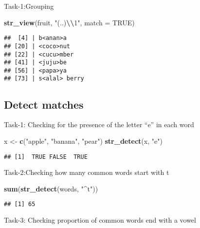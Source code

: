 \documentclass[
]{article}
\newenvironment{Shaded}{\begin{snugshade}}{\end{snugshade}}
\newcommand{\AttributeTok}[1]{\textcolor[rgb]{0.13,0.29,0.53}{#1}}
\newcommand{\ConstantTok}[1]{\textcolor[rgb]{0.56,0.35,0.01}{#1}}
\newcommand{\FunctionTok}[1]{\textcolor[rgb]{0.13,0.29,0.53}{\textbf{#1}}}
\newcommand{\NormalTok}[1]{#1}
\newcommand{\OtherTok}[1]{\textcolor[rgb]{0.56,0.35,0.01}{#1}}
\newcommand{\SpecialCharTok}[1]{\textcolor[rgb]{0.81,0.36,0.00}{\textbf{#1}}}
\newcommand{\StringTok}[1]{\textcolor[rgb]{0.31,0.60,0.02}{#1}}
\begin{document}
Task-1:Grouping

\begin{Shaded}
\begin{Highlighting}[]
\FunctionTok{str\_view}\NormalTok{(fruit, }\StringTok{"(..)}\SpecialCharTok{\textbackslash{}\textbackslash{}}\StringTok{1"}\NormalTok{, }\AttributeTok{match =} \ConstantTok{TRUE}\NormalTok{)}
\end{Highlighting}
\end{Shaded}

\begin{verbatim}
##  [4] | b<anan>a
## [20] | <coco>nut
## [22] | <cucu>mber
## [41] | <juju>be
## [56] | <papa>ya
## [73] | s<alal> berry
\end{verbatim}

\hypertarget{detect-matches}{%
\subsection{Detect matches}\label{detect-matches}}

Task-1: Checking for the presence of the letter ``e'' in each word

\begin{Shaded}
\begin{Highlighting}[]
\NormalTok{x }\OtherTok{\textless{}{-}} \FunctionTok{c}\NormalTok{(}\StringTok{"apple"}\NormalTok{, }\StringTok{"banana"}\NormalTok{, }\StringTok{"pear"}\NormalTok{)}
\FunctionTok{str\_detect}\NormalTok{(x, }\StringTok{"e"}\NormalTok{)}
\end{Highlighting}
\end{Shaded}

\begin{verbatim}
## [1]  TRUE FALSE  TRUE
\end{verbatim}

Task-2:Checking how many common words start with t

\begin{Shaded}
\begin{Highlighting}[]
\FunctionTok{sum}\NormalTok{(}\FunctionTok{str\_detect}\NormalTok{(words, }\StringTok{"\^{}t"}\NormalTok{))}
\end{Highlighting}
\end{Shaded}

\begin{verbatim}
## [1] 65
\end{verbatim}

Task-3: Checking proportion of common words end with a vowel
\end{document}
